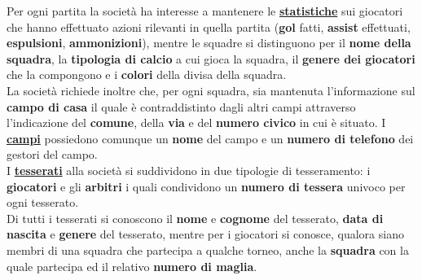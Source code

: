 \documentclass[11pt, openany]{article}
\theoremstyle{definition}
\theoremstyle{plain}
\theoremstyle{remark}
\begin{document}
\begin{tcolorbox}[width=\textwidth, colback={Cornsilk2}]
				Per ogni partita la società ha interesse a mantenere le \textbf{\underline{statistiche}} sui giocatori che hanno effettuato azioni rilevanti in quella partita (\textbf{gol} fatti, \textbf{assist} effettuati, \textbf{espulsioni}, \textbf{ammonizioni}), mentre le squadre si distinguono per il \textbf{nome della squadra}, la \textbf{tipologia di calcio} a cui gioca la squadra, il \textbf{genere dei giocatori} che la compongono e i \textbf{colori} della divisa della squadra.\\
				La società richiede inoltre che, per ogni squadra, sia mantenuta l’informazione sul \textbf{campo di casa} il quale è contraddistinto dagli altri campi attraverso l’indicazione del \textbf{comune}, della \textbf{via} e del \textbf{numero civico} in cui è situato. I \textbf{\underline{campi}} possiedono comunque un \textbf{nome} del campo e un	\textbf{numero di telefono} dei gestori del campo.\\
				I \textbf{\underline{tesserati}} alla società si suddividono in due tipologie di tesseramento: i \textbf{giocatori} e gli \textbf{arbitri} i quali condividono un \textbf{numero di tessera} univoco per ogni tesserato.\\
				Di tutti i tesserati si conoscono il \textbf{nome} e \textbf{cognome} del tesserato, \textbf{data di nascita} e \textbf{genere} del tesserato, mentre per i giocatori si conosce, qualora siano membri di una squadra che partecipa a qualche torneo, anche la \textbf{squadra} con la quale partecipa ed il relativo \textbf{numero di maglia}.
			\end{tcolorbox}
		
\end{document}
